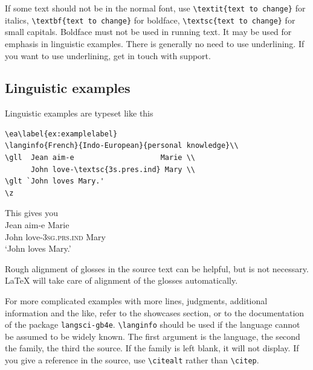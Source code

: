 If some text should not be in the normal font, use 
\verb+\textit{text to change}+ for italics, 
\verb+\textbf{text to change}+ for boldface, 
\verb+\textsc{text to change}+ for small capitals. Boldface must not be used in running text. It may be used for emphasis in linguistic examples. 
There is generally no need to use underlining. If you want to use underlining, get in touch with support.

\subsection{Linguistic examples}
Linguistic examples are typeset like this

\begin{verbatim}
\ea\label{ex:examplelabel}
\langinfo{French}{Indo-European}{personal knowledge}\\
\gll  Jean aim-e                    Marie \\
      John love-\textsc{3s.pres.ind} Mary \\
\glt `John loves Mary.'    
\z
\end{verbatim}

\newcommand{\sg}{\textsc{sg}}
\newcommand{\prs}{\textsc{prs}}
\newcommand{\ind}{\textsc{ind}}
This gives you
\ea\label{ex:examplelabel}
\\
\gll  Jean aim-e Marie \\
      John love-{3\sg.\prs.\ind} Mary \\
\glt `John loves Mary.'    
\z

Rough alignment of glosses in the source text can be helpful, but is not necessary. \LaTeX\xspace will take care of alignment of the glosses automatically. 
% 

For more complicated examples with more lines, judgments, additional information and the like, refer to the showcases section, or to the documentation of the package \verb+langsci-gb4e+.
\verb+\langinfo+ should be used if the language cannot be assumed to be widely known. The first argument is the language, the second the family, the third the source. If the family is left blank, it will not display. If you give a reference in the source, use \verb+\citealt+ rather than \verb+\citep+.

